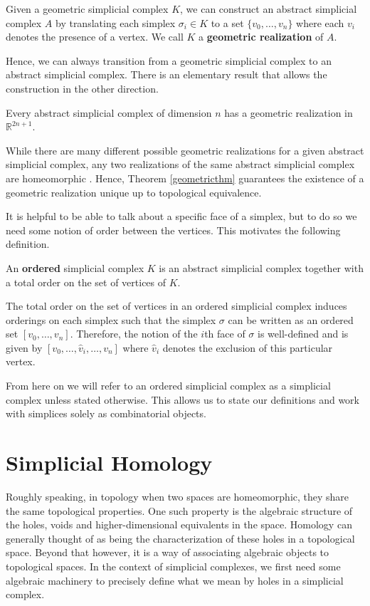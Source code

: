 \begin{definition}
Given a geometric simplicial complex $K$, we can construct an abstract simplicial complex $A$ by translating each simplex $\sigma_{i} \in K$ to a set $\{v_{0},\dots,v_{n}\}$ where each $v_{i}$  denotes the presence of a vertex. We call $K$ a \textbf{geometric realization} of $A$.
\end{definition}
Hence, we can always transition from a geometric simplicial complex to an abstract simplicial complex. There is an elementary result that allows the construction in the other direction.
\begin{theorem}\label{geometricthm}
Every abstract simplicial complex of dimension $n$ has a geometric realization in $\mathbb{R}^{2n+1}$.
\end{theorem}
While there are many different possible geometric realizations for a given abstract simplicial complex, any two realizations of the same abstract simplicial complex are homeomorphic \cite[Theorem 3.1, p. ~15]{munkres}. Hence, Theorem \ref{geometricthm} guarantees the existence of a geometric realization unique up to topological equivalence.

It is helpful to be able to talk about a specific face of a simplex, but to do so we need some notion of order between the vertices. This motivates the following definition.
\begin{definition}
An \textbf{ordered} simplicial complex $K$ is an abstract simplicial complex together with a total order on the set of vertices of $K$.
\end{definition}
The total order on the set of vertices in an ordered simplicial complex induces orderings on each simplex such that the simplex $\sigma$ can be written as an ordered set $[v_{0},\dots,v_{n}]$. Therefore, the notion of the $i$th face of $\sigma$ is well-defined and is given by $[v_{0},\dots,\hat v_{i},\dots,v_{n}]$ where $\hat v_{i}$ denotes the exclusion of this particular vertex.


From here on we will refer to an ordered simplicial complex as a simplicial complex unless stated otherwise. This allows us to state our definitions and work with simplices solely as combinatorial objects.
\section{Simplicial Homology}
Roughly speaking, in topology when two spaces are homeomorphic, they share the same topological properties. One such property is the algebraic structure of the holes, voids and higher-dimensional equivalents in the space.
Homology can generally thought of as being the characterization of these holes in a topological space. Beyond that however, it is a way of associating algebraic objects to topological spaces. In the context of simplicial complexes, we first need some algebraic machinery to precisely define what we mean by holes in a simplicial complex.

